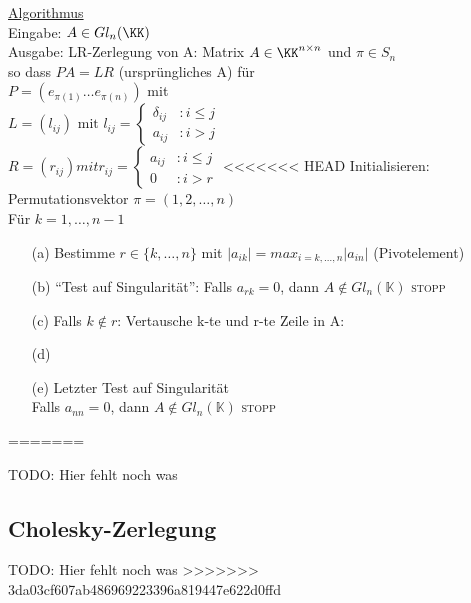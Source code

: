 \underline{Algorithmus} \\
Eingabe: $A \in Gl_n (\KK)$ \\
Ausgabe: LR-Zerlegung von A:  Matrix $ A \in \KK^{n \times n}$ und
$\pi \in S_n$ \\
so dass $PA = LR$ (ursprüngliches A) für \\
$P = (e_{\pi(1)} \dots e_{\pi(n)})$ mit \\
$L = (l_{ij}) \text{ mit } l_{ij} =
\begin{cases} \delta_{ij} &: i \le j \\  a_{ij} &: i > j  \end{cases} $ \\
$R = (r_{ij}) mit r_{ij} =
\begin{cases} a_{ij} &: i \le j \\ 0 &: i > r  \end{cases}$
<<<<<<< HEAD
Initialisieren: Permutationsvektor $\pi = (1,2, \dots, n)$\\
Für $k = 1, \dots, n-1$ \\

\begin{enumerate}
\item[(a)] Bestimme $r \in \{k, \dots, n \} $ mit $ |a_{ik}|
= max_{i= k, \dots, n} |a_{in}|$ (Pivotelement)
\item[(b)] "`Test auf Singularität"': Falls $a_{rk}=0$, 
	dann $A \notin Gl_n(\mathbb{K})$ \textsc{stopp}
\item[(c)] 
Falls $k \notin r$: Vertausche k-te und r-te Zeile in A:

\begin{algorithm}
\begin{algorithmic}

\State {}
\EndFunction
\end{algorithmic}
\end{algorithm}

\item[(d)] 
\item[(e)]
Letzter Test auf Singularität\\
Falls $a_{nn}=0$, dann $A \notin Gl_n(\mathbb{K})$ \textsc{stopp}
\end{enumerate}
=======

TODO: Hier fehlt noch was

\subsection{Cholesky-Zerlegung}

TODO: Hier fehlt noch was
>>>>>>> 3da03cf607ab486969223396a819447e622d0ffd
